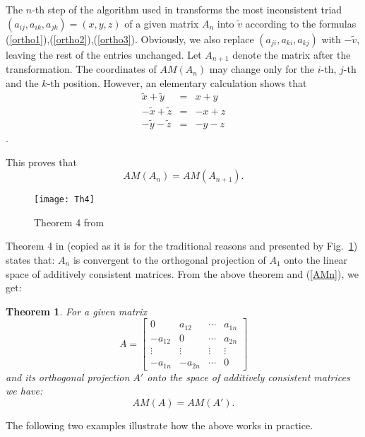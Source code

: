 \documentclass [12pt]{article}
\newtheorem{thm}{\bf Theorem}
\theoremstyle{definition}
\begin{document}
The $n$-th step of the algorithm used in \cite{HK1996} transforms the most inconsistent triad $(a_{ij},a_{ik},a_{jk})=(x,y,z)$ of a given matrix $A_n$ into $\tilde{v}$ according to the formulas (\ref{ortho1}),(\ref{ortho2}),(\ref{ortho3}). Obviously, we also replace $(a_{ji},a_{ki},a_{kj})$ with $-\tilde{v}$, leaving the rest of the entries unchanged. Let $A_{n+1}$ denote the matrix after the transformation. The coordinates of $AM(A_n)$ may change only for the $i$-th, $j$-th and the $k$-th position. However, an elementary calculation shows that
\begin{eqnarray}
\tilde{x}+\tilde{y}&=& x+y\\
-\tilde{x}+\tilde{z}&=& -x+z\\
-\tilde{y}-\tilde{z}&=& -y-z
\end{eqnarray}.

This proves that 
\begin{equation} \label{AMn}
AM(A_n)=AM(A_{n+1}).
\end{equation}

\begin{figure}[h]
\centering
\texttt{[image: Th4]}
\caption[Theorem 4]{Theorem 4 from \cite{HK1996}}
\label{fig:Th4}
\end{figure}

Theorem 4 in \cite{HK1996} (copied as it is for the traditional reasons and presented by Fig.~\ref{fig:Th4})
states that: $A_n$ is convergent to the orthogonal projection of $A_1$ onto the linear space of additively consistent matrices. From the above theorem and (\ref{AMn}), we get:

\begin{thm} \label{AM}
For a given matrix
\begin{displaymath}
A = \begin{bmatrix}
0 & a_{12} & \cdots & a_{1n} \\ 
-a_{12} & 0 & \cdots & a_{2n} \\ 
\vdots & \vdots & \vdots & \vdots \\ 
-a_{1n} & -a_{2n} & \cdots & 0
\end{bmatrix}
\end{displaymath}
and its orthogonal projection $A'$ onto the space of additively consistent matrices we have:
$$AM(A)=AM(A').$$
\end{thm}

The following two examples illustrate how the above works in practice.
\end{document}
